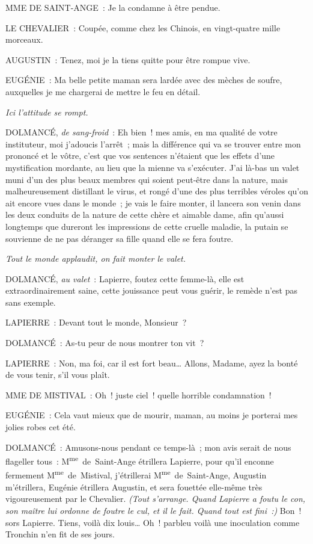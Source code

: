 \documentclass[french,twoside]{book} %
\begin{document}
MME DE SAINT-ANGE : Je la condamne à être pendue.\par
LE CHEVALIER : Coupée, comme chez les Chinois, en vingt-quatre mille morceaux.\par
AUGUSTIN : Tenez, moi je la tiens quitte pour être rompue vive.\par
EUGÉNIE : Ma belle petite maman sera lardée avec des mèches de soufre, auxquelles je me chargerai de mettre le feu en détail.\par
{\itshape Ici l’attitude se rompt.}\par
DOLMANCÉ, {\itshape de sang-froid} : Eh bien ! mes amis, en ma qualité de votre instituteur, moi j’adoucis l’arrêt ; mais la différence qui va se trouver entre mon prononcé et le vôtre, c’est que vos sentences n’étaient que les effets d’une mystification mordante, au lieu que la mienne va s’exécuter. J’ai là-bas un valet muni d’un des plus beaux membres qui soient peut-être dans la nature, mais malheureusement distillant le virus, et rongé d’une des plus terribles véroles qu’on ait encore vues dans le monde ; je vais le faire monter, il lancera son venin dans les deux conduits de la nature de cette chère et aimable dame, afin qu’aussi longtemps que dureront les impressions de cette cruelle maladie, la putain se souvienne de ne pas déranger sa fille quand elle se fera foutre.\par
{\itshape Tout le monde applaudit, on fait monter le valet.}\par
DOLMANCÉ, {\itshape au valet} : Lapierre, foutez cette femme-là, elle est extraordinairement saine, cette jouissance peut vous guérir, le remède n’est pas sans exemple.\par
LAPIERRE : Devant tout le monde, Monsieur ?\par
DOLMANCÉ : As-tu peur de nous montrer ton vit ?\par
LAPIERRE : Non, ma foi, car il est fort beau… Allons, Madame, ayez la bonté de vous tenir, s’il vous plaît.\par
MME DE MISTIVAL : Oh ! juste ciel ! quelle horrible condamnation !\par
EUGÉNIE : Cela vaut mieux que de mourir, maman, au moins je porterai mes jolies robes cet été.\par
DOLMANCÉ : Amusons-nous pendant ce temps-là ; mon avis serait de nous flageller tous : M\textsuperscript{me} de Saint-Ange étrillera Lapierre, pour qu’il enconne fermement M\textsuperscript{me} de Mistival, j’étrillerai M\textsuperscript{me} de Saint-Ange, Augustin m’étrillera, Eugénie étrillera Augustin, et sera fouettée elle-même très vigoureusement par le Chevalier. {\itshape (Tout s’arrange. Quand Lapierre a foutu le con, son maître lui ordonne de foutre le cul, et il le fait. Quand tout est fini :)} Bon ! sors Lapierre. Tiens, voilà dix louis… Oh ! parbleu voilà une inoculation comme Tronchin n’en fit de ses jours.\par
\end{document}
